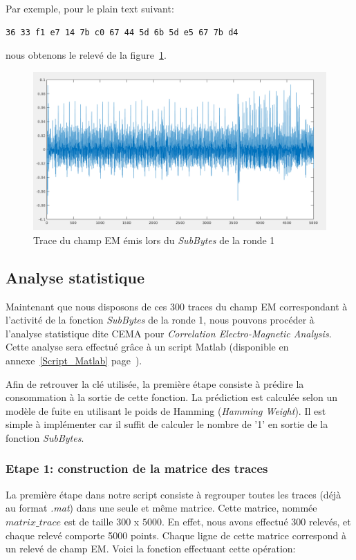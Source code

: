 \documentclass[a4paper, 12pt]{article}
\begin{document}
Par exemple, pour le plain text suivant:
\begin{lstlisting}
36 33 f1 e7 14 7b c0 67 44 5d 6b 5d e5 67 7b d4
\end{lstlisting}
nous obtenons le relevé de la figure~\ref{matlab_trace_1}.
		\begin{figure}[H]
			\begin{center}
			\includegraphics[scale=0.3]{images/matlab_trace_1.png}
			\end{center}
			\caption{Trace du champ EM émis lors du \emph{SubBytes} de la ronde 1}
			\label{matlab_trace_1}
		\end{figure}
		
	\subsection{Analyse statistique}
	Maintenant que nous disposons de ces 300 traces du champ EM correspondant à l'activité de la fonction \emph{SubBytes} de la ronde 1, nous pouvons procéder à l'analyse statistique dite CEMA pour \emph{Correlation Electro-Magnetic Analysis}. Cette analyse sera effectué grâce à un script Matlab (disponible en annexe~\ref{Script_Matlab} page~\pageref{Script_Matlab}).
	
	Afin de retrouver la clé utilisée, la première étape consiste à prédire la consommation à la sortie de cette fonction. La prédiction est calculée selon un modèle de fuite en utilisant le poids de Hamming (\emph{Hamming Weight}). Il est simple à implémenter car il suffit de calculer le nombre de '1' en sortie de la fonction \emph{SubBytes}.
	
	\subsubsection{Etape 1: construction de la matrice des traces}
		La première étape dans notre script consiste à regrouper toutes les traces (déjà au format \emph{.mat}) dans une seule et même matrice. Cette matrice, nommée $matrix\_trace$ est de taille $300$ x $5000$. En effet, nous avons effectué 300 relevés, et chaque relevé comporte 5000 points. Chaque ligne de cette matrice correspond à un relevé de champ EM. Voici la fonction effectuant cette opération:\\
		
\end{document}
